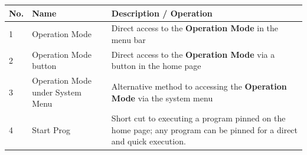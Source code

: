 \begin{longtable}[]{@{}lll@{}}
\toprule
\begin{minipage}[b]{0.13\columnwidth}\raggedright
No.\strut
\end{minipage} & \begin{minipage}[b]{0.15\columnwidth}\raggedright
Name\strut
\end{minipage} & \begin{minipage}[b]{0.63\columnwidth}\raggedright
Description / Operation\strut
\end{minipage}\tabularnewline
\midrule
\endhead
\begin{minipage}[t]{0.13\columnwidth}\raggedright
1\strut
\end{minipage} & \begin{minipage}[t]{0.15\columnwidth}\raggedright
Operation Mode\strut
\end{minipage} & \begin{minipage}[t]{0.63\columnwidth}\raggedright
Direct access to the \textbf{Operation Mode} in the menu bar\strut
\end{minipage}\tabularnewline
\begin{minipage}[t]{0.13\columnwidth}\raggedright
2\strut
\end{minipage} & \begin{minipage}[t]{0.15\columnwidth}\raggedright
Operation Mode button\strut
\end{minipage} & \begin{minipage}[t]{0.63\columnwidth}\raggedright
Direct access to the \textbf{Operation Mode} via a button in the home
page\strut
\end{minipage}\tabularnewline
\begin{minipage}[t]{0.13\columnwidth}\raggedright
3\strut
\end{minipage} & \begin{minipage}[t]{0.15\columnwidth}\raggedright
Operation Mode under System Menu\strut
\end{minipage} & \begin{minipage}[t]{0.63\columnwidth}\raggedright
Alternative method to accessing the \textbf{Operation Mode} via the
system menu\strut
\end{minipage}\tabularnewline
\begin{minipage}[t]{0.13\columnwidth}\raggedright
4\strut
\end{minipage} & \begin{minipage}[t]{0.15\columnwidth}\raggedright
Start Prog\strut
\end{minipage} & \begin{minipage}[t]{0.63\columnwidth}\raggedright
Short cut to executing a program pinned on the home page; any program
can be pinned for a direct and quick execution.\strut
\end{minipage}\tabularnewline
\bottomrule
\end{longtable}

